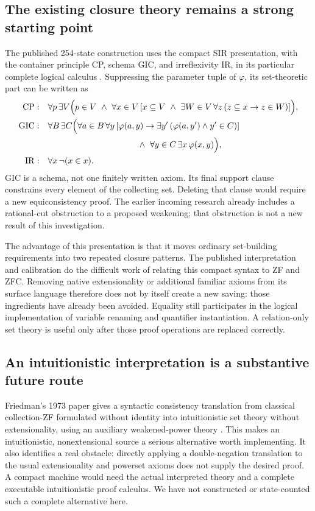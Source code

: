 \documentclass[11pt,a4paper]{article}
\begin{document}
\subsection{The existing closure theory remains a strong starting point}

The published 254-state construction uses the compact SIR presentation,
with the container principle CP, schema GIC, and
irreflexivity IR, in its particular complete logical calculus
\cite{sir,logic}. Suppressing the parameter tuple of $\varphi$, its
set-theoretic part can be written as
\begin{align*}
\mathrm{CP}:\quad&\forall p\,\exists V\Bigl(p\in V\ \land\
 \forall x\in V\,[x\subseteq V\ \land\
 \exists W\in V\,\forall z\,(z\subseteq x\to z\in W)]\Bigr),\\
\mathrm{GIC}:\quad&\forall B\,\exists C\Bigl(
 \forall a\in B\,\forall y\,[\varphi(a,y)\to
       \exists y'\,(\varphi(a,y')\land y'\in C)]\\
 &\hspace{37mm}\land\ \forall y\in C\,\exists x\,\varphi(x,y)\Bigr),\\
\mathrm{IR}:\quad&\forall x\,\neg(x\in x).
\end{align*}
GIC is a schema, not one finitely written axiom. Its final support clause
constrains every element of the collecting set. Deleting that clause
would require a new equiconsistency proof. The earlier incoming research
already includes a rational-cut obstruction to a proposed weakening;
that obstruction is not a new result of this investigation.

The advantage of this presentation is that it moves ordinary set-building
requirements into two repeated closure patterns. The published
interpretation and calibration do the difficult work of relating this
compact syntax to ZF and ZFC. Removing native extensionality or additional
familiar axioms from its surface language therefore does not by itself
create a new saving: those ingredients have already been avoided.
Equality still participates in the logical implementation of variable
renaming and quantifier instantiation. A relation-only set theory is
useful only after those proof operations are replaced correctly.

\subsection{An intuitionistic interpretation is a substantive future route}

Friedman's 1973 paper gives a syntactic consistency translation from
classical collection-ZF formulated without identity into intuitionistic
set theory without extensionality, using an auxiliary weakened-power
theory \cite{friedman}. This makes an intuitionistic, nonextensional
source a serious alternative worth implementing. It also identifies a
real obstacle: directly applying a double-negation translation to the
usual extensionality and powerset axioms does not supply the desired
proof. A compact machine would need the actual interpreted theory and
a complete executable intuitionistic proof calculus. We have not
constructed or state-counted such a complete alternative here.
\end{document}

